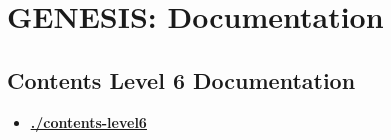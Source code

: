 \documentclass[12pt]{article}
\begin{document}
\section*{GENESIS: Documentation}

\subsection*{Contents Level 6 Documentation}

\begin{itemize}

\item \href{.././contents-level6/./contents-level6.pdf}{\bf \underline{./contents-level6}}


\end{itemize}

\end{document}
